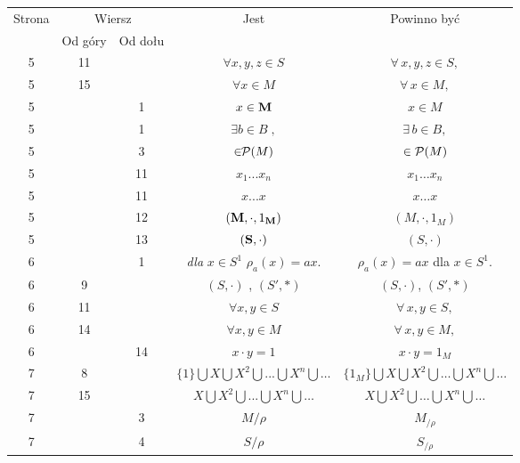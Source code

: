 \documentclass[a4paper,11pt]{article}
\begin{document}
\begin{center}

  \begin{tabular}{|c|c|c|c|c|}
    \hline
    Strona & \multicolumn{2}{c|}{Wiersz} & Jest
                              & Powinno być \\ \cline{2-3}
    & Od góry & Od dołu & & \\
    \hline
    5  & 11 & & $\forall x, y, z \in S$ & $\forall \, x, y, z \in S,$ \\
    5  & 15 & & $\forall x \in M$ & $\forall \, x \in M,$ \\
    5  & &  1 & $x \in \textrm{\textbf{M}}$ & $x \in M$ \\
    5  & &  1 & $\exists b \in B\; ,$ & $\exists \, b \in B,$ \\
    5  & &  3 & $\in \!\! \mathcal{P}( M )$ & $\in \mathcal{P}( M )$ \\
    5  & & 11 & $x_{ 1 } ... x_{ n }$ & $x_{ 1 } \ldots x_{ n }$ \\
    5  & & 11 & $x ... x$ & $x \ldots x$ \\
    5  & & 12 & $( \textrm{\textbf{M}}, \cdot, 1_{ \textrm{\textbf{M}}} )$
           & $( M, \cdot, 1_{ M } )$ \\
    5  & & 13 & $( \textrm{\textbf{S}}, \cdot )$ & $( S, \cdot )$ \\
    6  & &  1 & \textit{dla} $x \in S^{ 1 }$ $\rho_{ a }( x )= a x$.
                & $\rho_{ a }( x ) = a x$ dla $x \in S^{ 1 }$. \\
    6  &  9 & & $( S, \cdot )${ }, { }{ }$( S', \ast )$
              & $( S, \cdot )$, $( S', \ast )$ \\
    6  & 11 & & $\forall x, y \in S$ & $\forall \, x, y \in S,$ \\
    6  & 14 & & $\forall x, y \in M$ & $\forall \, x, y \in M,$ \\
    6  & & 14 & $x \cdot y = 1$ & $x \cdot y = 1_{ M }$ \\
    7  &  8 & & $\{ 1 \} \bigcup X \bigcup X^{ 2 } \bigcup ... \bigcup X^{ n } \bigcup \ldots$
           & $\{ 1_{ M } \} \bigcup X \bigcup X^{ 2 } \bigcup \ldots \bigcup X^{ n } \bigcup \ldots$ \\
    7  & 15 & & $X \bigcup X^{ 2 } \bigcup ... \bigcup X^{ n } \bigcup \ldots$
           & $X \bigcup X^{ 2 } \bigcup \ldots \bigcup X^{ n } \bigcup \ldots$ \\
    7  & &  3 & $M / \rho$ & $M_{ / \rho }$ \\
    7  & &  4 & $S / \rho$ & $S_{ / \rho }$ \\

\end{tabular}
\end{center}
\end{document}
